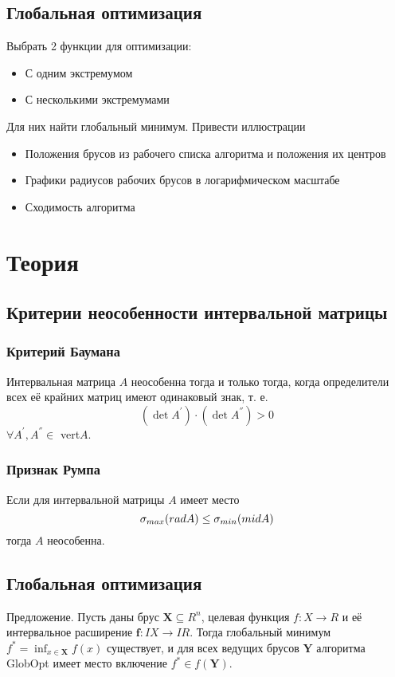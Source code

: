 \documentclass[a4paper,12pt]{article}
\begin{document}
    \subsection{Глобальная оптимизация}
    Выбрать 2 функции для оптимизации:
    \begin{itemize}
        \item С одним экстремумом
        \item С несколькими экстремумами
    \end{itemize}
    Для них найти глобальный минимум. Привести иллюстрации
    \begin{itemize}
        \item Положения брусов из рабочего списка алгоритма и положения их центров
        \item Графики радиусов рабочих брусов в логарифмическом масштабе
        \item Сходимость алгоритма
    \end{itemize}

    \section{Теория}
    \subsection{Критерии неособенности интервальной матрицы}
    \subsubsection{Критерий Баумана}
    Интервальная матрица \textbf{$ A $} неособенна тогда и только тогда, 
    когда определители всех её крайних матриц имеют одинаковый знак, т. е.
    \begin{equation}
        (\det{A^{'}}) \cdot (\det{A^{''}}) > 0
    \end{equation}
    $ \forall A^{'}, A^{''} \in $ vert\textbf{$ A $}.

    \subsubsection{Признак Румпа}
    Если для интервальной матрицы \textbf{$ A $} имеет место
    \begin{equation}
        \sigma_{max}(rad\textbf{$ A $}) \le \sigma_{min}(mid\textbf{$ A $})
    \end{equation}
    тогда \textbf{$ A $} неособенна.

    \subsection{Глобальная оптимизация}
    Предложение.\newline
    Пусть даны брус $ \textbf{X} \subseteq R^{n} $, целевая функция $ f: X \to R $
    и её интервальное расширение $ \textbf{f} : IX \to IR $. Тогда глобальный минимум
    $ f^{*} = \inf_{x \in \textbf{X}}f(x) $ существует, и для всех ведущих брусов
    $ \textbf{Y} $ алгоритма GlobOpt имеет место включение $ f^{*} \in f(\textbf{Y}) $.
\end{document}
